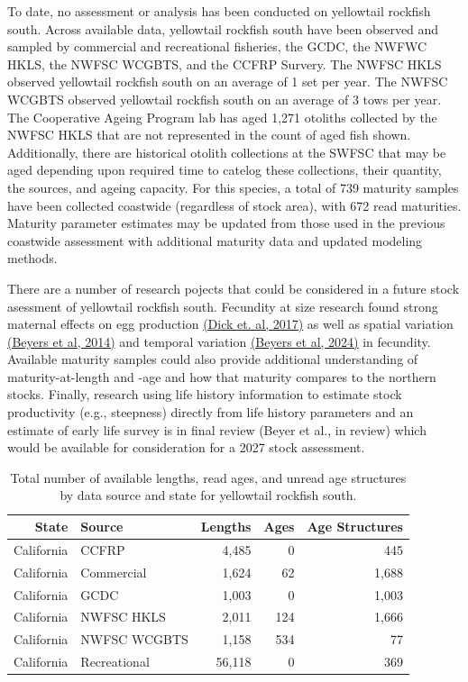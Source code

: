 \documentclass[
  english,
]{article}
\begin{document}
To date, no assessment or analysis has been conducted on yellowtail
rockfish south. Across available data, yellowtail rockfish south have
been observed and sampled by commercial and recreational fisheries, the
GCDC, the NWFWC HKLS, the NWFSC WCGBTS, and the CCFRP Survery. The NWFSC
HKLS observed yellowtail rockfish south on an average of 1 set per year.
The NWFSC WCGBTS observed yellowtail rockfish south on an average of 3
tows per year. The Cooperative Ageing Program lab has aged 1,271
otoliths collected by the NWFSC HKLS that are not represented in the
count of aged fish shown. Additionally, there are historical otolith
collections at the SWFSC that may be aged depending upon required time
to catelog these collections, their quantity, the sources, and ageing
capacity. For this species, a total of 739 maturity samples have been
collected coastwide (regardless of stock area), with 672 read
maturities. Maturity parameter estimates may be updated from those used
in the previous coastwide assessment with additional maturity data and
updated modeling methods.

There are a number of research pojects that could be considered in a
future stock asessment of yellowtail rockfish south. Fecundity at size
research found strong maternal effects on egg production
\href{https://repository.library.noaa.gov/view/noaa/62673}{(Dick et. al,
2017)} as well as spatial variation
\href{https://cdnsciencepub.com/doi/full/10.1139/cjfas-2023-0253}{(Beyers
et al, 2014)} and temporal variation
\href{https://cdnsciencepub.com/doi/full/10.1139/cjfas-2023-0253}{(Beyers
et al, 2024)} in fecundity. Available maturity samples could also
provide additional understanding of maturity-at-length and -age and how
that maturity compares to the northern stocks. Finally, research using
life history information to estimate stock productivity (e.g.,
steepness) directly from life history parameters and an estimate of
early life survey is in final review (Beyer et al., in review) which
would be available for consideration for a 2027 stock assessment.

\begingroup
\fontsize{9.0pt}{11.0pt}\selectfont
\begin{longtable}{r>{\raggedleft\arraybackslash}p{\dimexpr 105.00pt -2\tabcolsep-1.5\arrayrulewidth}rrr}
\caption{Total number of available lengths, read ages, and unread age structures
by data source and state for yellowtail rockfish south.}\tabularnewline

\toprule
State & Source & Lengths & Ages & Age Structures \\ 
\midrule\addlinespace[2.5pt]
California & CCFRP & 4,485 & 0 & 445 \\ 
California & Commercial & 1,624 & 62 & 1,688 \\ 
California & GCDC & 1,003 & 0 & 1,003 \\ 
California & NWFSC HKLS & 2,011 & 124 & 1,666 \\ 
California & NWFSC WCGBTS & 1,158 & 534 & 77 \\ 
California & Recreational & 56,118 & 0 & 369 \\ 
\bottomrule
\end{longtable}
\endgroup
\end{document}
